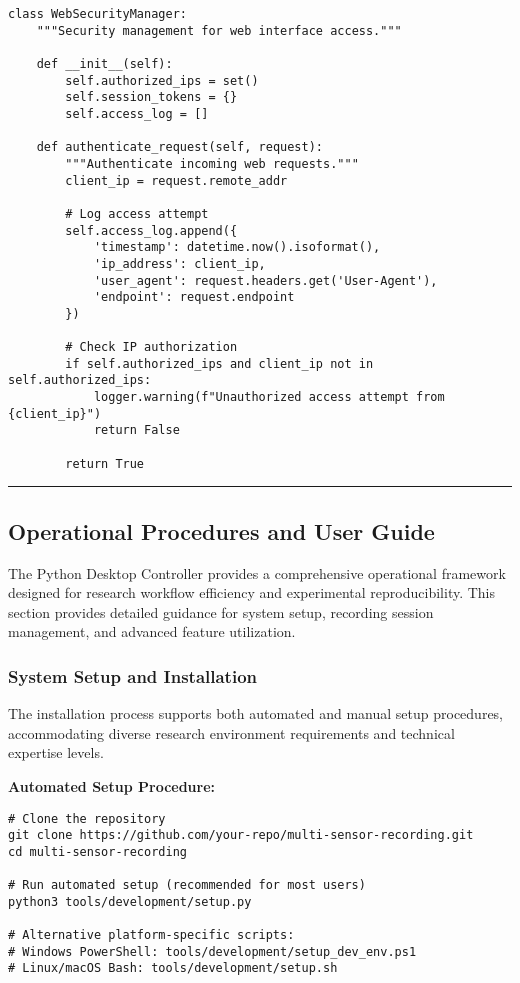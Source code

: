 \documentclass[12pt,a4paper]{article}
\begin{document}
\begin{verbatim}
class WebSecurityManager:
    """Security management for web interface access."""
    
    def __init__(self):
        self.authorized_ips = set()
        self.session_tokens = {}
        self.access_log = []
    
    def authenticate_request(self, request):
        """Authenticate incoming web requests."""
        client_ip = request.remote_addr
        
        # Log access attempt
        self.access_log.append({
            'timestamp': datetime.now().isoformat(),
            'ip_address': client_ip,
            'user_agent': request.headers.get('User-Agent'),
            'endpoint': request.endpoint
        })
        
        # Check IP authorization
        if self.authorized_ips and client_ip not in self.authorized_ips:
            logger.warning(f"Unauthorized access attempt from {client_ip}")
            return False
        
        return True
\end{verbatim}

\hrule

\subsection{Operational Procedures and User Guide}

The Python Desktop Controller provides a comprehensive operational framework designed for research workflow efficiency
and experimental reproducibility. This section provides detailed guidance for system setup, recording session
management, and advanced feature utilization.

\subsubsection{System Setup and Installation}

The installation process supports both automated and manual setup procedures, accommodating diverse research environment
requirements and technical expertise levels.

\textbf{Automated Setup Procedure:}

\begin{verbatim}
# Clone the repository
git clone https://github.com/your-repo/multi-sensor-recording.git
cd multi-sensor-recording

# Run automated setup (recommended for most users)
python3 tools/development/setup.py

# Alternative platform-specific scripts:
# Windows PowerShell: tools/development/setup_dev_env.ps1
# Linux/macOS Bash: tools/development/setup.sh
\end{verbatim}
\end{document}
